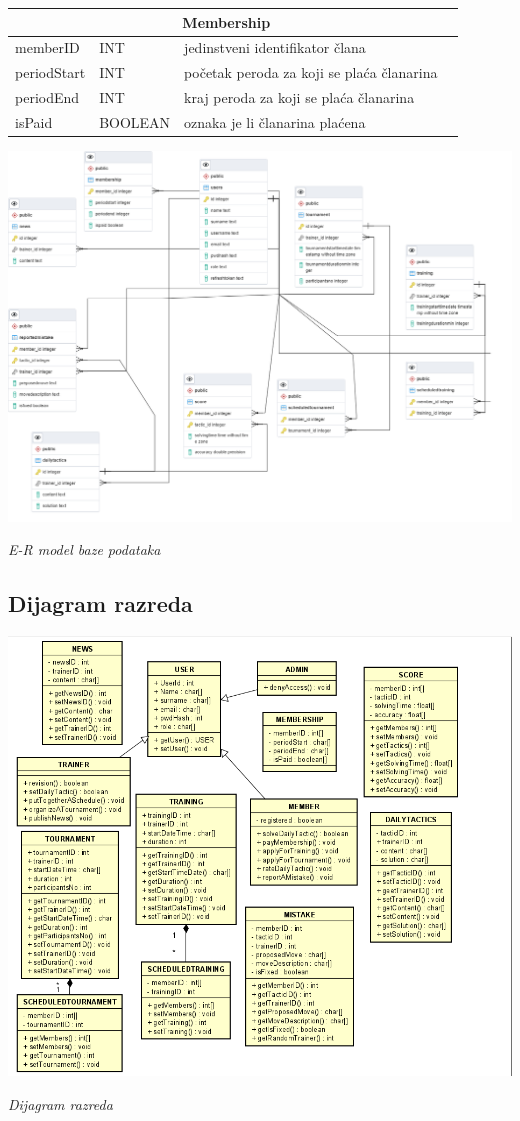 \documentclass{article}
\begin{document}
\begin{center}
    \begin{tabular}{ | l | l | l | p{5cm} |}
    \hline
    \multicolumn{3}{|c|}{Membership}  \\ \hline
   \cellcolor{green!25}memberID & INT & jedinstveni identifikator člana \\ \hline
    periodStart & INT & početak peroda za koji se plaća članarina \\ \hline
    periodEnd & INT & kraj peroda za koji se plaća članarina \\ \hline
      isPaid & BOOLEAN & oznaka je li članarina plaćena\\ \hline
      
    \end{tabular}
\end{center}



	\includegraphics[width=\columnwidth]{ERbaze.png}
		\begin{center}
			\textit{E-R model baze podataka}
		\end{center}

\eject

	\subsection{Dijagram razreda}

	\includegraphics[width=\columnwidth]{slike/dijagramRazreda.PNG}
		\begin{center}
			\textit{Dijagram razreda}
		\end{center}
\end{document}
